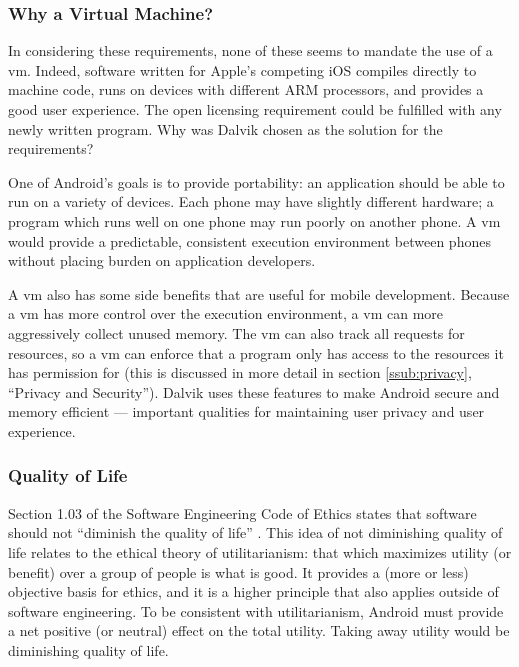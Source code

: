 \documentclass[11pt]{article}
\begin{document}
\begin{multicols}{2}

\subsubsection{Why a Virtual Machine?} %
\label{ssub:why-vm}

In considering these requirements, none of these seems to mandate the use of a
\gls{vm}.  Indeed, software written for Apple's competing iOS compiles directly
to machine code, runs on devices with different ARM processors, and provides a
good user experience.  The open licensing requirement could be fulfilled with
any newly written program.  Why was Dalvik chosen as the solution for the
requirements?

One of Android's goals is to provide portability: an application should be able
to run on a variety of devices.  Each phone may have slightly different
hardware; a program which runs well on one phone may run poorly on another
phone.  A \gls{vm} would provide a predictable, consistent execution environment
between phones without placing burden on application developers.

A \gls{vm} also has some side benefits that are useful for mobile development.
Because a \gls{vm} has more control over the execution environment, a \gls{vm}
can more aggressively collect unused memory.  The \gls{vm} can also track all
requests for resources, so a \gls{vm} can enforce that a program only has access
to the resources it has permission for (this is discussed in more detail in
section \ref{ssub:privacy}, ``Privacy and Security'').  Dalvik uses these
features to make Android secure and memory efficient --- important qualities for
maintaining user privacy and user experience.


\subsubsection{Quality of Life} %
\label{ssub:quality}

Section 1.03 of the Software Engineering Code of Ethics states that software
should not ``diminish the quality of life'' \cite[\S1.03]{secode}.  This idea of
not diminishing quality of life relates to the ethical theory of utilitarianism:
that which maximizes utility (or benefit) over a group of people is what is
good.  It provides a (more or less) objective basis for ethics, and it is a
higher principle that also applies outside of software engineering.  To be
consistent with utilitarianism, Android must provide a net positive (or neutral)
effect on the total utility.  Taking away utility would be diminishing quality
of life.


\end{multicols}
\end{document}
